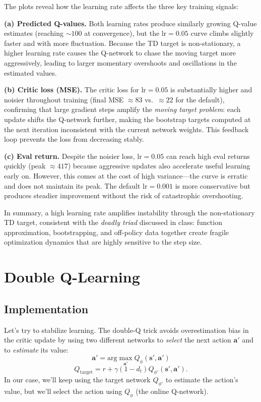 \documentclass{article}
\def\rva{{\mathbf{a}}}
\def\rvs{{\mathbf{s}}}
\begin{document}
\begin{itemize}
The plots reveal how the learning rate affects the three key training signals:

\textbf{(a) Predicted Q-values.} Both learning rates produce similarly growing Q-value estimates (reaching $\sim\!100$ at convergence), but the lr$=0.05$ curve climbs slightly faster and with more fluctuation. Because the TD target is non-stationary, a higher learning rate causes the Q-network to chase the moving target more aggressively, leading to larger momentary overshoots and oscillations in the estimated values.

\textbf{(b) Critic loss (MSE).} The critic loss for lr$=0.05$ is substantially higher and noisier throughout training (final MSE $\approx 83$ vs.\ $\approx 22$ for the default), confirming that large gradient steps amplify the \emph{moving target problem}: each update shifts the Q-network further, making the bootstrap targets computed at the next iteration inconsistent with the current network weights. This feedback loop prevents the loss from decreasing stably.

\textbf{(c) Eval return.} Despite the noisier loss, lr$=0.05$ can reach high eval returns quickly (peak $\approx 417$) because aggressive updates also accelerate useful learning early on. However, this comes at the cost of high variance---the curve is erratic and does not maintain its peak. The default lr$=0.001$ is more conservative but produces steadier improvement without the risk of catastrophic overshooting.

In summary, a high learning rate amplifies instability through the non-stationary TD target, consistent with the \emph{deadly triad} discussed in class: function approximation, bootstrapping, and off-policy data together create fragile optimization dynamics that are highly sensitive to the step size.

\end{itemize}



\section{Double Q-Learning}

\subsection{Implementation}

Let's try to stabilize learning. The double-Q trick avoids overestimation bias in the critic update by using two different networks to \textit{select} the next action $\rva'$ and to \textit{estimate} its value:
\[\rva' = \textrm{arg}\max_{\rva'} Q_{\phi}(\rvs', \rva')\]
\[Q_{\textrm{target}} = r + \gamma(1-d_t) Q_{\phi'}(\rvs', \rva').\]
In our case, we'll keep using the target network $Q_{\phi'}$ to estimate the action's value, but we'll select the action using $Q_{\phi}$ (the online Q-network).
\end{document}
